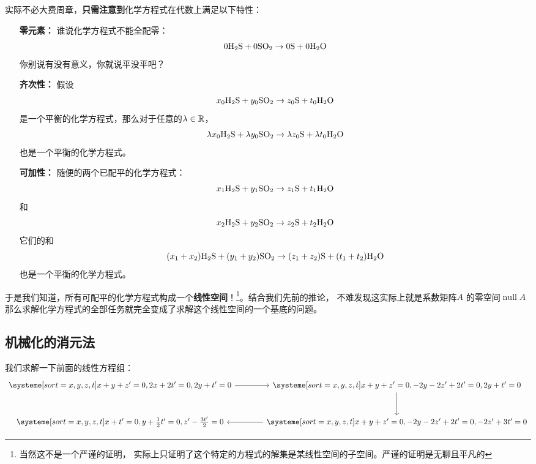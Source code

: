 \documentclass{ctexart}
\DeclareMathOperator{\nullspace}{null}
\begin{document}
实际不必大费周章，\textbf{只需注意到}化学方程式在代数上满足以下特性：
\begin{itemize}
    \item[\textbf{零元素：}] 谁说化学方程式不能全配零：\[
            0 \ce{H2S} + 0 \ce{SO2} \to 0 \ce{S} + 0 \ce{H2O}
        \]
        你别说有没有意义，你就说平没平吧？
    \item[\textbf{齐次性：}] 假设\[
            x_0 \ce{H2S} + y_0 \ce{SO2} \to z_0 \ce{S} + t_0 \ce{H2O}
        \]
        是一个平衡的化学方程式，那么对于任意的\(\lambda \in \mathbb{R}\)，
        \[
            \lambda x_0 \ce{H2S} + \lambda y_0 \ce{SO2} \to
            \lambda z_0 \ce{S} + \lambda t_0 \ce{H2O}
        \]
        也是一个平衡的化学方程式。
    \item[\textbf{可加性：}] 随便的两个已配平的化学方程式：\[
            x_1 \ce{H2S} + y_1 \ce{SO2} \to z_1 \ce{S} + t_1 \ce{H2O}
        \]
        和
        \[
            x_2 \ce{H2S} + y_2 \ce{SO2} \to z_2 \ce{S} + t_2 \ce{H2O}
        \]
        它们的和
        \[
            (x_1 + x_2) \ce{H2S} + (y_1 + y_2) \ce{SO2} \to
            (z_1 + z_2) \ce{S} + (t_1 + t_2) \ce{H2O}
        \]
        也是一个平衡的化学方程式。
\end{itemize}

于是我们知道，所有可配平的化学方程式构成一个\textbf{线性空间}！\footnote{当然这不是一个严谨的证明，
实际上只证明了这个特定的方程式的解集是某线性空间的子空间。严谨的证明是无聊且平凡的}。结合我们先前的推论，
不难发现这实际上就是系数矩阵\(A\) 的零空间\(\nullspace A\) 那么求解化学方程式的全部任务就完全变成了求解这个线性空间的一个基底的问题。

\subsection{机械化的消元法}
我们求解一下前面的线性方程组：
\[
    \begin{tikzcd}[column sep=large, row sep=large]
        \systeme[sort={x, y, z, t}]{
            x + y + z^{\prime} = 0,
            2x + 2t^{\prime} = 0,
            2y + t^{\prime} = 0
        }
        \arrow[r] &
        \systeme[sort={x, y, z, t}]{
            x + y + z^{\prime} = 0,
            -2y - 2z^{\prime} + 2t^{\prime} = 0,
            2y +t^{\prime} = 0
        }
        \arrow[d] \\
        \systeme[sort={x, y, z, t}]{
            x + t^{\prime} = 0,
            y + \frac{1}{2}t^{\prime} = 0,
            z^{\prime} - \frac{3t^{\prime}}{2} = 0
        } &
        \systeme[sort={x, y, z, t}]{
            x + y + z^{\prime} = 0,
            -2y -2z^{\prime} + 2t^{\prime} = 0,
            -2z^{\prime} + 3t^{\prime} = 0
        }
        \arrow[l]
    \end{tikzcd}
\]
\end{document}
